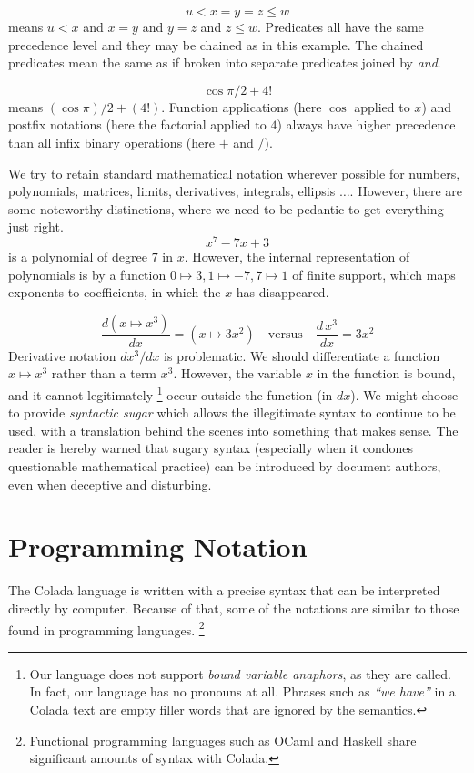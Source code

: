 \documentclass[12pt]{article}
\numberwithin{definition}{section}
\begin{document}
\[
\boxed{u < x = y = z \le w}
\]
means $u < x$ and $x = y$ and $y = z$ and $z\le w$.  Predicates all have the
same precedence level and they may be chained as in this example.
The chained predicates mean the same as if broken into separate predicates
joined by \emph{and}.

\[
\boxed{\cos \pi/2 + 4!}
\]
means $(\cos\pi)/2 + (4!)$.  Function applications (here $\cos$
applied to $x$) and postfix notations (here the factorial applied to
$4$) always have higher precedence than all infix binary operations
(here $+$ and $/$).


We try to retain standard mathematical notation wherever possible for
numbers, polynomials, matrices, limits, derivatives, integrals,
ellipsis $\ldots$.  However, there are some noteworthy distinctions,
where we need to be pedantic to get everything just right.
\[
\boxed{x^7 - 7 x + 3}
\]
is a polynomial of degree $7$ in $x$. However, the internal representation
of polynomials is by a function $0\mapsto3,1\mapsto-7,7\mapsto1$
of finite support, which maps exponents to coefficients,
in which the $x$ has disappeared.

\[
\boxed{\frac{d (x\mapsto x^3)}{dx} = (x \mapsto 3 x^2)}\quad\text{versus}\quad
\boxed{\frac{d\,x^3}{dx} = 3 x^2}
\]
Derivative notation $dx^3/dx$ is problematic. We should differentiate
a function $x \mapsto x^3$ rather than a term $x^3$.  However, the
variable $x$ in the function is bound, and it cannot legitimately%
%
\footnote{Our language does not support \emph{bound variable
    anaphors}, as they are called. In fact, our language has no
  pronouns at all. Phrases such as \emph{``we have''} in a Colada text
  are empty filler words that are ignored by the semantics.}  
%
occur outside the function (in $dx$).  We might choose to provide
\emph{syntactic sugar} which allows the illegitimate syntax to
continue to be used, with a translation behind the scenes into
something that makes sense.  The reader is hereby warned that sugary
syntax (especially when it condones questionable mathematical
practice) can be introduced by document authors, even when deceptive
and disturbing.




\section{Programming Notation}

The Colada language is written with a precise syntax that can 
be interpreted directly by computer.  Because of that, some of the
notations are similar to those found in programming languages.%
\footnote{Functional programming languages such as OCaml and Haskell
  share significant amounts of syntax with Colada.}
\end{document}
